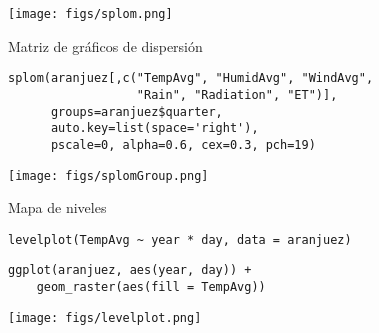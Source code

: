 \documentclass[aspectratio=169, usenames,svgnames,dvipsnames]{beamer}
\begin{document}
\begin{frame}[label={sec:orga146bab}]{}
\begin{center}
\texttt{[image: figs/splom.png]}
\end{center}
\end{frame}

\begin{frame}[label={sec:orgd77128d},fragile]{Matriz de gráficos de dispersión}
 \lstset{language=r,label= ,caption= ,captionpos=b,numbers=none}
\begin{lstlisting}
splom(aranjuez[,c("TempAvg", "HumidAvg", "WindAvg",
                  "Rain", "Radiation", "ET")],
      groups=aranjuez$quarter,
      auto.key=list(space='right'),
      pscale=0, alpha=0.6, cex=0.3, pch=19)
\end{lstlisting}
\end{frame}

\begin{frame}[label={sec:org1ec73f4}]{}
\begin{center}
\texttt{[image: figs/splomGroup.png]}
\end{center}
\end{frame}

\begin{frame}[label={sec:org49aa1ee},fragile]{Mapa de niveles}
 \lstset{language=r,label= ,caption= ,captionpos=b,numbers=none}
\begin{lstlisting}
levelplot(TempAvg ~ year * day, data = aranjuez)
\end{lstlisting}

\lstset{language=r,label= ,caption= ,captionpos=b,numbers=none}
\begin{lstlisting}
ggplot(aranjuez, aes(year, day)) + 
    geom_raster(aes(fill = TempAvg))
\end{lstlisting}
\end{frame}

\begin{frame}[label={sec:org9bbe135}]{}
\begin{center}
\texttt{[image: figs/levelplot.png]}
\end{center}
\end{frame}
\end{document}
